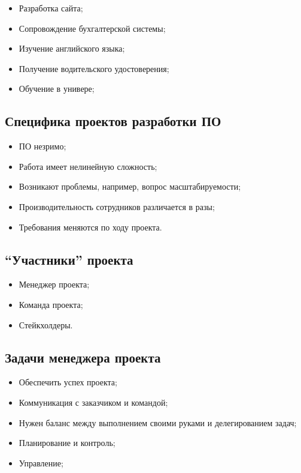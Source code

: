 \documentclass[a4paper,8pt]{article}
\begin{document}
    \begin{itemize}
        \item Разработка сайта;
        \item Сопровождение бухгалтерской системы;
        \item Изучение английского языка;
        \item Получение водительского удостоверения;
        \item Обучение в универе;
    \end{itemize}

\subsection{Специфика проектов разработки ПО}


    \begin{itemize}
        \item ПО незримо;
        \item Работа имеет нелинейную сложность;
        \item Возникают проблемы, например, вопрос масштабируемости;
        \item Производительность сотрудников различается в разы;
        \item Требования меняются по ходу проекта.
    \end{itemize}

\subsection{``Участники'' проекта}

    \begin{itemize}
        \item Менеджер проекта;
        \item Команда проекта;
        \item Стейкхолдеры.
    \end{itemize}


\subsection{Задачи менеджера проекта}


    \begin{itemize}
        \item Обеспечить успех проекта;
        \item Коммуникация с заказчиком и командой;
        \item Нужен баланс между выполнением своими руками и делегированием задач;
        \item Планирование и контроль;
        \item Управление;
    \end{itemize}
\end{document}
